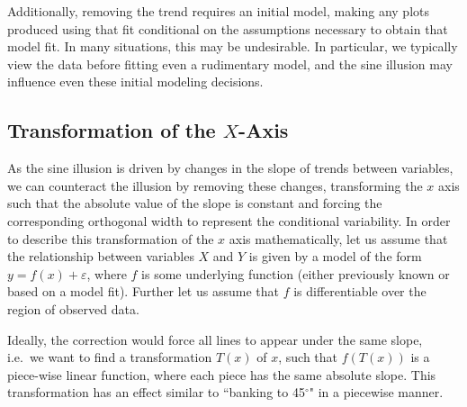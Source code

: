 \documentclass[12pt]{article}\usepackage[]{graphicx}\usepackage[]{color}
\begin{document}
Additionally, removing the trend requires an initial model, making any plots produced using that fit conditional on the assumptions necessary to obtain that model fit. In many situations, this may be undesirable. In particular, we typically view the data before fitting even a rudimentary model, and the sine illusion may influence even these initial modeling decisions.

\subsection{Transformation of the $X$-Axis}
As the sine illusion is driven by changes in the slope of trends between variables, we can counteract the illusion by removing these changes, transforming the $x$ axis such that the absolute value of the slope is constant and forcing the corresponding orthogonal width to represent the conditional variability.
In order to describe this transformation of the $x$ axis mathematically, 
let us assume that the relationship between variables $X$ and $Y$ is given by a  model of the form 
$ y = f(x) + \varepsilon$, 
where $f$ is some underlying function (either previously known or based on a model fit). Further let us assume that  $f$ is differentiable over the region of observed data.

Ideally, the correction would force all lines to appear under the same slope, i.e.~we want to find a transformation $T(x)$ of $x$, such that $f(T(x))$ is a  piece-wise linear function, where each piece has the same absolute slope. This transformation has an effect similar to ``banking to 45$^\circ$" in a piecewise manner. 
\end{document}
